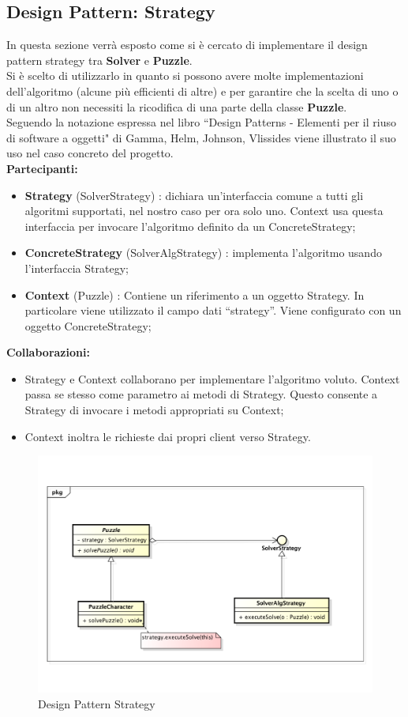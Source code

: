 	\subsection{Design Pattern: Strategy} \label{DPS}
In questa sezione verrà esposto come si è cercato di implementare il design pattern strategy tra \textbf{Solver} e \textbf{Puzzle}. \\
Si è scelto di utilizzarlo in quanto si possono avere molte implementazioni dell'algoritmo (alcune più efficienti di altre) e per garantire che la scelta di uno o di un altro non necessiti la ricodifica di una parte della classe \textbf{Puzzle}. \\
Seguendo la notazione espressa nel libro ``Design Patterns - Elementi per il riuso di software a oggetti" di Gamma, Helm, Johnson, Vlissides viene illustrato il suo uso nel caso concreto del progetto. \\
\textbf{Partecipanti:}
		\begin{itemize}
			\item \textbf{Strategy} (SolverStrategy) :  dichiara un'interfaccia comune a tutti gli algoritmi supportati, nel nostro caso per ora solo uno. Context usa questa interfaccia per invocare l'algoritmo definito da un ConcreteStrategy;
			\item \textbf{ConcreteStrategy} (SolverAlgStrategy) : implementa l'algoritmo usando l'interfaccia Strategy;
			\item \textbf{Context} (Puzzle) : Contiene un riferimento a un oggetto Strategy. In particolare viene utilizzato il campo dati ``strategy''. Viene configurato con un oggetto ConcreteStrategy; \\
		\end{itemize}
\noindent
\textbf{Collaborazioni:}
		\begin{itemize}
			\item Strategy e Context collaborano per implementare l'algoritmo voluto. Context passa se stesso come parametro ai metodi di Strategy. Questo consente a Strategy di invocare i metodi appropriati su Context;
			\item Context inoltra le richieste dai propri client verso Strategy.
		\end{itemize}
\noindent
	\begin{figure}[htbp]
		\centering
		\includegraphics[width=15cm]{img/DesignPatternStrategy.pdf}
		\caption{Design Pattern Strategy}
		\label{Design Pattern Strategy}
	\end{figure}


